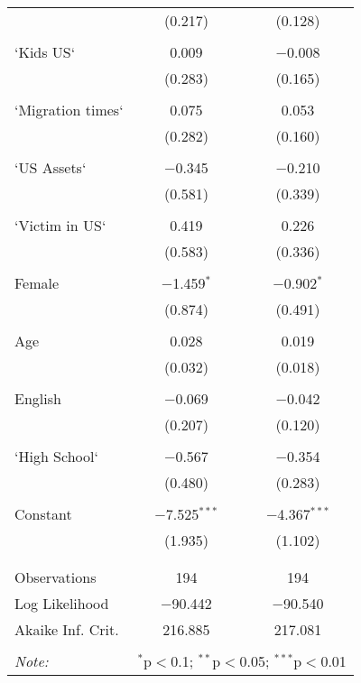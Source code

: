 \begin{table}[!htbp]
\begin{tabular}{@{\extracolsep{5pt}}lcc}
  & (0.217) & (0.128) \\ 
  & & \\ 
 `Kids US` & 0.009 & $-$0.008 \\ 
  & (0.283) & (0.165) \\ 
  & & \\ 
 `Migration times` & 0.075 & 0.053 \\ 
  & (0.282) & (0.160) \\ 
  & & \\ 
 `US Assets` & $-$0.345 & $-$0.210 \\ 
  & (0.581) & (0.339) \\ 
  & & \\ 
 `Victim in US` & 0.419 & 0.226 \\ 
  & (0.583) & (0.336) \\ 
  & & \\ 
 Female & $-$1.459$^{*}$ & $-$0.902$^{*}$ \\ 
  & (0.874) & (0.491) \\ 
  & & \\ 
 Age & 0.028 & 0.019 \\ 
  & (0.032) & (0.018) \\ 
  & & \\ 
 English & $-$0.069 & $-$0.042 \\ 
  & (0.207) & (0.120) \\ 
  & & \\ 
 `High School` & $-$0.567 & $-$0.354 \\ 
  & (0.480) & (0.283) \\ 
  & & \\ 
 Constant & $-$7.525$^{***}$ & $-$4.367$^{***}$ \\ 
  & (1.935) & (1.102) \\ 
  & & \\ 
\hline \\[-1.8ex] 
Observations & 194 & 194 \\ 
Log Likelihood & $-$90.442 & $-$90.540 \\ 
Akaike Inf. Crit. & 216.885 & 217.081 \\ 
\hline 
\hline \\[-1.8ex] 
\textit{Note:}  & \multicolumn{2}{r}{$^{*}$p$<$0.1; $^{**}$p$<$0.05; $^{***}$p$<$0.01} \\ 
\end{tabular} 
\end{table} 
